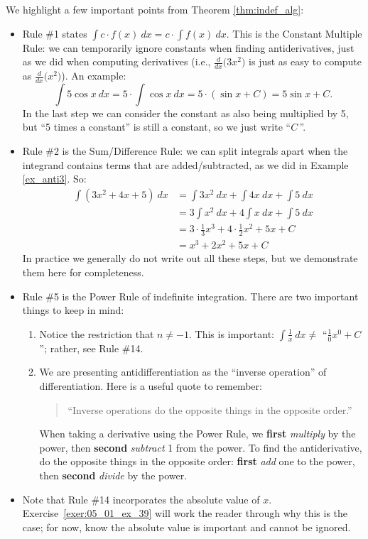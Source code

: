 We highlight a few important points from Theorem \ref{thm:indef_alg}:
\begin{itemize}
	\item		Rule \#1 states $\int c\cdot f(x)\ dx = c\cdot \int f(x)\ dx$. This is the Constant Multiple Rule:  we can temporarily ignore constants when finding antiderivatives, just as we did when computing derivatives (i.e., $\frac{d}{dx}\big(3x^2\big)$ is just as easy to compute as $\frac{d}{dx}\big(x^2\big)$). An example:
	$$\int 5\cos x\ dx = 5\cdot\int \cos x\ dx = 5\cdot (\sin x+C) = 5\sin x + C.$$
	In the last step we can consider the constant as also being multiplied by 5, but ``5 times a constant'' is still a constant, so we just write ``$C$\,''.
	\item		Rule \#2 is the Sum/Difference Rule: we can split integrals apart when the integrand contains terms that are added/subtracted, as we did in Example \ref{ex_anti3}. So:
	\begin{align*}
	\int(3x^2+4x+5)\ dx &= \int 3x^2\ dx + \int 4x\ dx + \int 5\ dx \\
											&= 3\int x^2\ dx + 4\int x\ dx + \int 5 \ dx\\
											&= 3\cdot \frac13x^3 + 4\cdot \frac12x^2+5x+C\\
											&= x^3+2x^2+5x+C
	\end{align*}
	In practice we generally do not write out all these steps, but we demonstrate them here for completeness.
	\item		Rule \#5 is the Power Rule of indefinite integration. There are two important things to keep in mind:
		\begin{enumerate}
		\item		Notice the restriction that $n\neq -1$. This is important: $\int \frac{1}{x}\ dx \neq $ ``$\frac{1}{0}x^0+C$''; rather, see Rule \#14.
		\item		We are presenting antidifferentiation as the ``inverse operation'' of differentiation. Here is a useful quote to remember:
		\begin{quote}%
		``Inverse operations do the opposite things in the opposite order.''
		\end{quote}
		When taking a derivative using the Power Rule, we \textbf{first} \textit{multiply} by the power, then \textbf{second} \textit{subtract} 1 from the power. To find the antiderivative, do the opposite things in the opposite order: \textbf{first} \textit{add} one to the power, then \textbf{second} \textit{divide} by the power.
			\end{enumerate}
		\item		Note that Rule \#14 incorporates the absolute value of $x$. Exercise~\ref{exer:05_01_ex_39} will work the reader through why this is the case; for now, know the absolute value is important and cannot be ignored.
\end{itemize}

